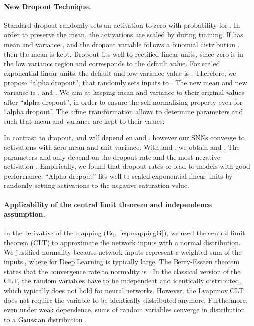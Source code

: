 \documentclass{article}
\begin{document}
\paragraph{New Dropout Technique.}
\label{sec:dropout} 
Standard dropout randomly sets an activation  to zero with probability  for . 
In order to preserve the mean, the activations are scaled by  during training. 
If  has mean  and variance
, and the dropout variable  follows
a binomial distribution , then the mean  is kept.
Dropout fits well to rectified linear units, since
zero is in the low variance region and corresponds
to the default value.
For scaled exponential linear units, the default and low variance
value is . 
Therefore, we propose ``alpha dropout'', 
that randomly sets inputs to . 
The new mean and new variance is
, and 
.
We aim at keeping mean and variance to their original values after ``alpha
dropout'', in order to ensure the self-normalizing property even for ``alpha dropout''.
The affine transformation  allows to
determine parameters  and  such that mean and variance are kept to their values: 

In contrast to dropout,  and  will depend on  and ,
however our SNNs converge to activations with
zero mean and unit variance.  
With  and , we obtain  and .
The parameters  and  only depend on the dropout rate  
and the most negative activation . 
Empirically, we found that dropout rates  or  lead to models with good performance.
``Alpha-dropout'' fits well to scaled exponential linear units by randomly setting 
activations to the negative saturation value.

\paragraph{Applicability of the central limit theorem and independence assumption.}
\label{sec:clt} 
In the derivative of the mapping (Eq.~\eqref{eq:mappingG}), we used the central limit theorem (CLT) 
to approximate the network inputs  with a normal distribution.
We justified normality because network inputs represent a weighted sum of the inputs , where for Deep Learning  is typically large.
The Berry-Esseen theorem states that the convergence rate to normality is  \citep{bib:Korolev2012}. 
In the classical version of the CLT, the random variables have to be independent and identically 
distributed, which typically does not hold for neural networks.
However, the Lyapunov CLT does not require the variable to be identically distributed anymore. Furthermore,
even under weak dependence, sums of random variables converge in distribution to a Gaussian distribution \cite{bib:Bradley1981}.
\end{document}
